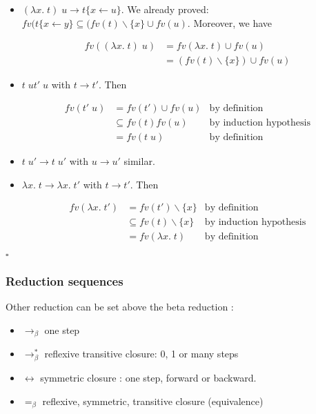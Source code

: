 \documentclass{article}
\theoremstyle{plain}
\theoremstyle{plain}
\renewcommand\qedsymbol{$\square$}
\begin{document}
  \begin{itemize}
    \item $(\lambda x.\;t)\;u \to t\{x \leftarrow u\}$. We already proved:
      $fv(t\{x \leftarrow y\} \subseteq (fv(t) \backslash \{x\} \cup fv(u)$.
      Moreover, we have

      \begin{align*}
        fv((\lambda x.\;t)\;u) &= fv(\lambda x.\;t) \cup fv(u) \\
            &= (fv(t)\backslash \{x\}) \cup fv(u)
      \end{align*}
    \item $t\;u t'\; u$ with $t \to t'$. Then

      \begin{align*}
        fv(t'\;u) &= fv(t') \cup fv(u) & \text{by definition} \\
        &\subseteq fv(t) fv(u) & \text{by induction hypothesis} \\
        &= fv(t\; u) & \text{by definition}
      \end{align*}

    \item $t\; u' \to t\; u'$ with $u \to u'$ similar.

    \item $\lambda x.\;t \to \lambda x.\; t'$ with $t\to t'$. Then

      \begin{align*}
        fv(\lambda x.\; t') &= fv(t')\backslash\{x\} & \text{by definition} \\
        &\subseteq fv(t) \backslash \{x\} & \text{by induction hypothesis} \\
        &= fv(\lambda x.\; t) & \text{by definition}
      \end{align*}
  \end{itemize}
  \qedsymbol

  \subsubsection{Reduction sequences}

  Other reduction can be set above the beta reduction :

  \begin{itemize}
    \item $\to_\beta$ one step
    \item $\to_\beta^*$ reflexive transitive closure: 0, 1 or many steps
    \item $\leftrightarrow$ symmetric closure : one step, forward or backward.
    \item $=_\beta$ reflexive, symmetric, transitive closure (equivalence)
  \end{itemize}
\end{document}
